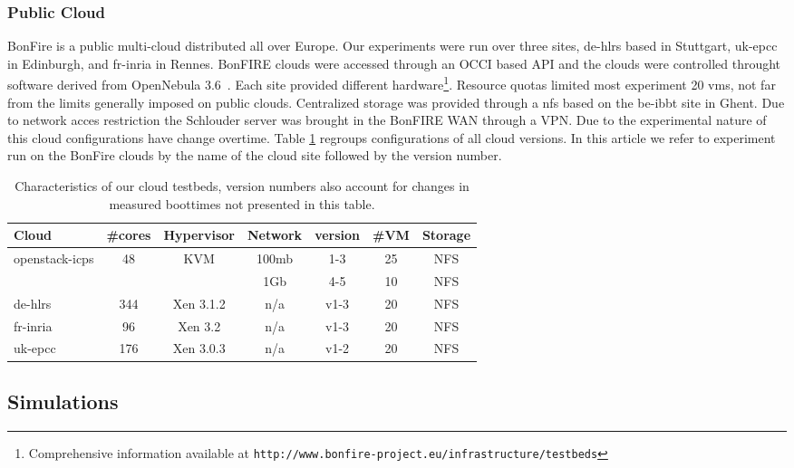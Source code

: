 \documentclass[a4paper,10pt]{article}
\begin{document}
\subsubsection{Public Cloud}

BonFire\cite{Kavoussanakis2013} is a public multi-cloud distributed all over
Europe. Our experiments were run over three sites, de-hlrs based in Stuttgart,
uk-epcc in Edinburgh, and fr-inria in Rennes. BonFIRE clouds were accessed
through an OCCI based API and the clouds were controlled throught software
derived from OpenNebula 3.6~. Each site provided different
hardware\footnote{Comprehensive information available at
\texttt{http://www.bonfire-project.eu/infrastructure/testbeds}}. Resource quotas
limited most experiment 20 \acp{vm}, not far from the limits generally
imposed on public clouds. Centralized storage was provided through a \ac{nfs}
based on the be-ibbt site in Ghent. Due to network acces restriction the
Schlouder server was brought in the BonFIRE WAN through a VPN. Due to the
experimental nature of this cloud configurations have change overtime. Table
\ref{tab:platforms} regroups configurations of all cloud versions. In this article
we refer to experiment run on the BonFire clouds by the name of the cloud site
followed by the version number.

\begin{table}
	\begin{tabular}{|l|c|c|c|c|c|c|}
		\hline
		Cloud&\#cores&Hypervisor&Network&version&\#VM&Storage\\ \hline
		\multirow{2}{*}{openstack-icps}&\multirow{2}{*}{48}&\multirow{2}{*}{KVM}&100mb&1-3&25&NFS\\\cline{4-7}
		&&&1Gb&4-5&10&NFS\\\hline
		de-hlrs&344&Xen 3.1.2&n/a&v1-3&20&NFS\\\hline
		fr-inria&96&Xen 3.2&n/a&v1-3&20&NFS\\\hline
		uk-epcc&176&Xen 3.0.3&n/a&v1-2&20&NFS\\\hline

	\end{tabular}
	\caption{Characteristics of our cloud testbeds, version numbers also
	account for changes in measured boottimes not presented in this table.}
	\label{tab:platforms}
\end{table}

\subsection{Simulations}
\end{document}
